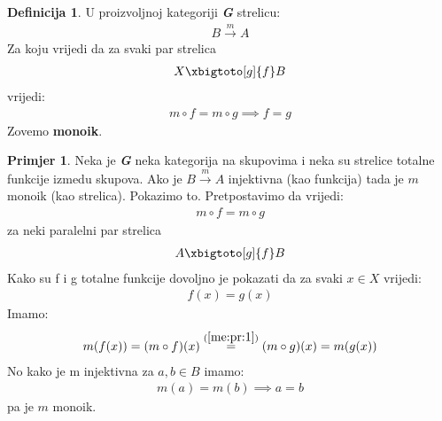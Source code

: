 \documentclass[11pt]{article}
\newcommand{\category}[1]{\textbf{\emph{#1}}}
\theoremstyle{definition}
\newtheorem{definition}{Definicija}
\newtheorem{primjer}{Primjer}
\begin{document}
  \begin{definition}
    U proizvoljnoj kategoriji \category{G} strelicu:
    \begin{align*}
      B \xrightarrow{m} A
    \end{align*}
    Za koju vrijedi da za svaki par strelica
    \begin{align*}
      X \xbigtoto[g]{f} B
    \end{align*}
    vrijedi:
    \begin{align}
      m \circ f = m \circ g \implies f = g
    \end{align}
    Zovemo \textbf{monoik}.
  \end{definition}
  \begin{primjer}
    Neka je \category{G} neka kategorija na skupovima i neka su strelice
    totalne funkcije izmedu skupova.
    Ako je $B \xrightarrow{m} A$ injektivna (kao funkcija) tada je $m$ monoik (kao
    strelica). Pokazimo to.
    Pretpostavimo da vrijedi:
    \begin{align} \label{me:pr:1}
      m \circ f = m \circ g
    \end{align}
    za neki paralelni par strelica
    \begin{align*}
      A \xbigtoto[g]{f} B
    \end{align*}
    Kako su f i g totalne funkcije dovoljno je pokazati da za svaki $x \in X$
    vrijedi:
    \begin{align*}
      f(x) = g(x)
    \end{align*}
    Imamo:
    \begin{align*}
      m(f(x)) = (m \circ f)(x) \overset{(\ref{me:pr:1})}{=} (m \circ g)(x) = m(g(x))
    \end{align*}
    No kako je m injektivna za $a, b \in B$ imamo:
    \begin{align*}
      m(a) = m(b) \implies a = b
    \end{align*}
    pa je $m$ monoik.
    \end{primjer}
\end{document}
